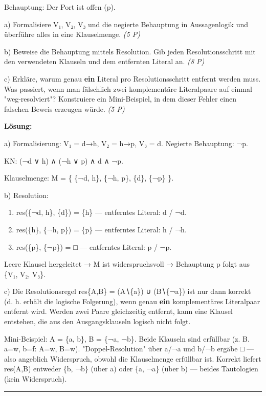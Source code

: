 \documentclass[11pt, a4paper]{article}
\begin{document}
Behauptung: Der Port ist offen (p).


a) Formalisiere V₁, V₂, V₃ und die negierte Behauptung in Aussagenlogik und überführe alles in eine Klauselmenge. \textit{(5 P)}


b) Beweise die Behauptung mittels Resolution. Gib jeden Resolutionsschritt mit den verwendeten Klauseln und dem entfernten Literal an. \textit{(8 P)}


c) Erkläre, warum genau \textbf{ein} Literal pro Resolutionsschritt entfernt werden muss. Was passiert, wenn man fälschlich zwei komplementäre Literalpaare auf einmal "weg-resolviert"? Konstruiere ein Mini-Beispiel, in dem dieser Fehler einen falschen Beweis erzeugen würde. \textit{(5 P)}


\textbf{Lösung:}


a) Formalisierung: V₁ = d→h, V₂ = h→p, V₃ = d. Negierte Behauptung: ¬p.

KN: (¬d ∨ h) ∧ (¬h ∨ p) ∧ d ∧ ¬p.

Klauselmenge: M = \{ \{¬d, h\}, \{¬h, p\}, \{d\}, \{¬p\} \}.


b) Resolution:

\begin{enumerate}
  \item res(\{¬d, h\}, \{d\}) = \{h\} — entferntes Literal: d / ¬d.
  \item res(\{h\}, \{¬h, p\}) = \{p\} — entferntes Literal: h / ¬h.
  \item res(\{p\}, \{¬p\}) = □ — entferntes Literal: p / ¬p.
\end{enumerate}

Leere Klausel hergeleitet → M ist widerspruchsvoll → Behauptung p folgt aus \{V₁, V₂, V₃\}.


c) Die Resolutionsregel res\{A,B\} = (A∖\{a\}) ∪ (B∖\{¬a\}) ist nur dann korrekt (d. h. erhält die logische Folgerung), wenn genau \textbf{ein} komplementäres Literalpaar entfernt wird. Werden zwei Paare gleichzeitig entfernt, kann eine Klausel entstehen, die aus den Ausgangsklauseln logisch nicht folgt.


Mini-Beispiel: A = \{a, b\}, B = \{¬a, ¬b\}. Beide Klauseln sind erfüllbar (z. B. a=w, b=f: A=w, B=w). "Doppel-Resolution" über a/¬a und b/¬b ergäbe □ — also angeblich Widerspruch, obwohl die Klauselmenge erfüllbar ist. Korrekt liefert res(A,B) entweder \{b, ¬b\} (über a) oder \{a, ¬a\} (über b) — beides Tautologien (kein Widerspruch).



\noindent\textcolor{rulegray}{\rule{\linewidth}{0.4pt}}
\end{document}
